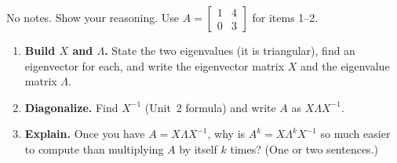 \documentclass[10pt]{article}
\begin{document}
\namedateperiod

\vspace{0.15in}

No notes. Show your reasoning. Use $A=\begin{bmatrix} 1 & 4 \\ 0 & 3 \end{bmatrix}$ for items 1--2.

\begin{enumerate}[leftmargin=1.8em, itemsep=14pt]
  \item \textbf{Build $X$ and $\Lambda$.} State the two eigenvalues (it is triangular), find an eigenvector
        for each, and write the eigenvector matrix $X$ and the eigenvalue matrix $\Lambda$.
        \vspace{1.7cm}
  \item \textbf{Diagonalize.} Find $X^{-1}$ (Unit~2 formula) and write $A$ as $X\Lambda X^{-1}$.
        \vspace{1.5cm}
  \item \textbf{Explain.} Once you have $A=X\Lambda X^{-1}$, why is $A^{k}=X\Lambda^{k}X^{-1}$ so much easier
        to compute than multiplying $A$ by itself $k$ times? (One or two sentences.)
\end{enumerate}
\end{document}
